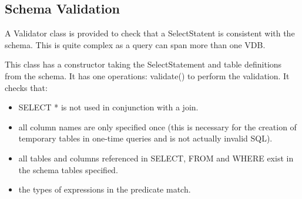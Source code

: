 \subsection{Schema Validation}

A Validator class is provided to check that a SelectStatent is consistent
with the schema. This is quite complex as a query can span more than
one VDB.

This class has a constructor taking the SelectStatement and table
definitions from the schema. It has one operations: validate() to
perform the validation. It checks that:

\begin{itemize} 
\item SELECT * is not used in conjunction with a join.
\item all column names are only specified once (this is
      necessary for the creation of temporary tables in one-time
      queries and is not actually invalid SQL).
\item all tables and columns referenced in SELECT, FROM
      and WHERE exist in the schema tables specified.
\item the types of expressions in the predicate match.
\end{itemize}

